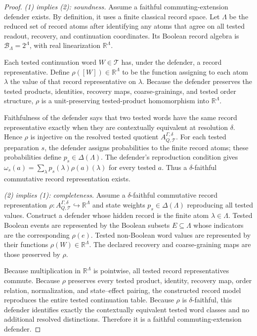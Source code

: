 \documentclass[11pt]{article}
\newcommand{\R}{\mathbb R}
\begin{document}
\begin{proof}
\emph{(1) implies (2): soundness.}  Assume a faithful
commuting-extension defender exists.  By definition, it uses a finite
classical record space.  Let $\Lambda$ be the reduced set of record
atoms after identifying any atoms that agree on all tested readout,
recovery, and continuation coordinates.  Its Boolean record algebra is
$\mathcal B_\Lambda=2^\Lambda$, with real linearization $\R^\Lambda$.

Each tested continuation word $W\in\mathcal T$ has, under the defender,
a record representative.  Define
$\rho([W])\in\R^\Lambda$ to be the function assigning to each atom
$\lambda$ the value of that record representative on $\lambda$.
Because the defender preserves the tested products, identities,
recovery maps, coarse-grainings, and tested order structure, $\rho$ is
a unit-preserving tested-product homomorphism into $\R^\Lambda$.

Faithfulness of the defender says that two tested words have the same
record representative exactly when they are contextually equivalent at
resolution $\delta$.  Hence $\rho$ is injective on the resolved tested
quotient $A^{\Gamma,\delta}_{Q,\mathcal T}$.  For each tested
preparation $s$, the defender assigns probabilities to the finite
record atoms; these probabilities define $p_s\in\Delta(\Lambda)$.  The
defender's reproduction condition gives
$\omega_s(a) = \sum_\lambda p_s(\lambda)\rho(a)(\lambda)$ for every
tested $a$.  Thus a $\delta$-faithful commutative record representation
exists.

\emph{(2) implies (1): completeness.}  Assume a $\delta$-faithful
commutative record representation
$\rho:A^{\Gamma,\delta}_{Q,\mathcal T}\hookrightarrow\R^\Lambda$ and
state weights $p_s\in\Delta(\Lambda)$ reproducing all tested values.
Construct a defender whose hidden record is the finite atom
$\lambda\in\Lambda$.  Tested Boolean events are represented by the
Boolean subsets $E\subseteq\Lambda$ whose indicators are the
corresponding $\rho(e)$.  Tested non-Boolean word values are
represented by their functions $\rho(W)\in\R^\Lambda$.  The declared
recovery and coarse-graining maps are those preserved by $\rho$.

Because multiplication in $\R^\Lambda$ is pointwise, all tested record
representatives commute.  Because $\rho$ preserves every tested
product, identity, recovery map, order relation, normalization, and
state--effect pairing, the constructed record model reproduces the
entire tested continuation table.  Because $\rho$ is $\delta$-faithful,
this defender identifies exactly the contextually equivalent tested
word classes and no additional resolved distinctions.  Therefore it is
a faithful commuting-extension defender.


\end{proof}
\end{document}
